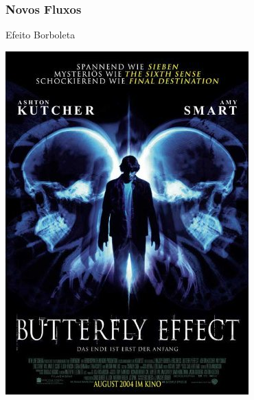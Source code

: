\begin{frame}
    \frametitle{Novos Fluxos}
    
    \alert{Efeito Borboleta}

    \includegraphics[height=0.8\textheight]{img/posters/butterfly_effect.jpg}
\end{frame}

